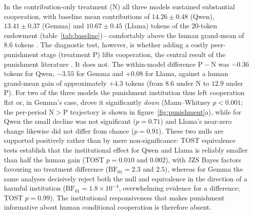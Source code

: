 In the contribution-only treatment (N) all three models sustained substantial cooperation, with baseline mean contributions of $14.26\pm0.48$ (Qwen), $13.41\pm0.37$ (Gemma) and $10.67\pm0.45$ (Llama) tokens of the 20-token endowment (table~\ref{tab:baseline})---comfortably above the human grand-mean of $8.6$ tokens \cite{herrmann2008antisocial}. The diagnostic test, however, is whether adding a costly peer-punishment stage (treatment P) lifts cooperation, the central result of the punishment literature \cite{fehr2002altruistic,herrmann2008antisocial}. It does not. The within-model difference $\mathrm{P}-\mathrm{N}$ was $-0.36$ tokens for Qwen, $-3.55$ for Gemma and $+0.08$ for Llama, against a human grand-mean gain of approximately $+4.3$ tokens (from $8.6$ under N to $12.9$ under P). For two of the three models the punishment institution thus left cooperation flat or, in Gemma's case, drove it significantly \emph{down} (Mann--Whitney $p<0.001$; the per-period $\mathrm{N}>\mathrm{P}$ trajectory is shown in figure~\ref{fig:punishment}a), while for Qwen the small decline was not significant ($p=0.71$) and Llama's near-zero change likewise did not differ from chance ($p=0.91$). These two nulls are supported positively rather than by mere non-significance: TOST equivalence tests establish that the institutional effect for Qwen and Llama is reliably smaller than half the human gain (TOST $p=0.010$ and $0.002$), with JZS Bayes factors favouring no treatment difference ($\mathrm{BF}_{01}=2.3$ and $2.5$), whereas for Gemma the same analyses decisively reject both the null and equivalence in the direction of a harmful institution ($\mathrm{BF}_{01}=1.8\times10^{-4}$, overwhelming evidence for a difference; TOST $p=0.99$). The institutional responsiveness that makes punishment informative about human conditional cooperation is therefore absent.

